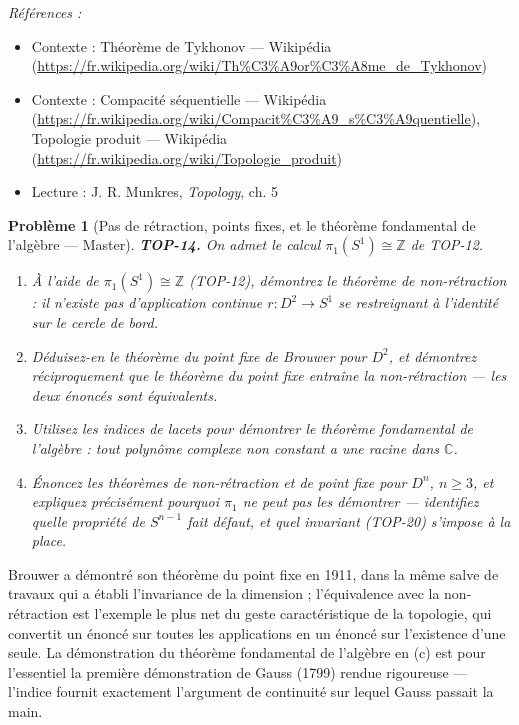 \documentclass[11pt]{article}
\newtheorem{problem}{Problème}
\newenvironment{refs}{\par\small\noindent\emph{Références :}\begin{itemize}\setlength\itemsep{0pt}}{\end{itemize}\normalsize}
\begin{document}
\begin{refs}
\item Contexte : Théorème de Tykhonov --- Wikipédia (\url{https://fr.wikipedia.org/wiki/Th%C3%A9or%C3%A8me_de_Tykhonov})
\item Contexte : Compacité séquentielle --- Wikipédia (\url{https://fr.wikipedia.org/wiki/Compacit%C3%A9_s%C3%A9quentielle}), Topologie produit --- Wikipédia (\url{https://fr.wikipedia.org/wiki/Topologie_produit})
\item Lecture : J. R. Munkres, \textit{Topology}, ch. 5
\end{refs}

\bigskip

\begin{problem}[{Pas de rétraction, points fixes, et le théorème fondamental de l'algèbre --- Master}]
\textbf{TOP-14.} On admet le calcul $ \pi_1(S^1) \cong \mathbb{Z} $ de TOP-12.
\begin{enumerate}
\item[(a)] À l'aide de $ \pi_1(S^1) \cong \mathbb{Z} $ (TOP-12), démontrez le théorème de non-rétraction :
il n'existe pas d'application continue $ r : D^2 \to S^1 $ se restreignant à l'identité sur le cercle
de bord.
\item[(b)] Déduisez-en le théorème du point fixe de Brouwer pour $ D^2 $, et démontrez réciproquement que le
théorème du point fixe entraîne la non-rétraction --- les deux énoncés sont équivalents.
\item[(c)] Utilisez les indices de lacets pour démontrer le théorème fondamental de l'algèbre : tout polynôme
complexe non constant a une racine dans $\mathbb{C}$.
\item[(d)] Énoncez les théorèmes de non-rétraction et de point fixe pour $ D^n $, $ n \ge 3 $, et
expliquez précisément pourquoi $ \pi_1 $ ne peut pas les démontrer --- identifiez quelle propriété de
$ S^{n-1} $ fait défaut, et quel invariant (TOP-20) s'impose à la place.
\end{enumerate}

\end{problem}

\noindent Brouwer a démontré son théorème du point fixe en 1911, dans la même salve de travaux
qui a établi l'invariance de la dimension ; l'équivalence avec la non-rétraction est l'exemple le plus net
du geste caractéristique de la topologie, qui convertit un énoncé sur toutes les applications en un énoncé
sur l'existence d'une seule. La démonstration du théorème fondamental de l'algèbre en (c) est pour
l'essentiel la première démonstration de Gauss (1799) rendue rigoureuse --- l'indice fournit exactement
l'argument de continuité sur lequel Gauss passait la main.
\end{document}
